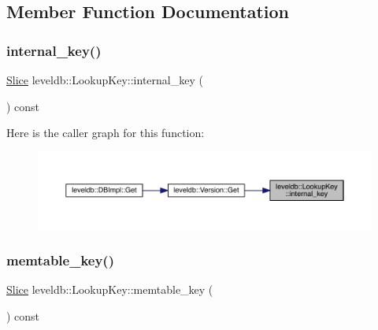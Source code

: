 \subsection{Member Function Documentation}
\mbox{\label{classleveldb_1_1_lookup_key_a3ba069ced6c871a1f420487e8ca99fc1}} 
\subsubsection{\texorpdfstring{internal\_key()}{internal\_key()}}
{\footnotesize\ttfamily \mbox{\hyperlink{classleveldb_1_1_slice}{Slice}} leveldb\+::\+Lookup\+Key\+::internal\+\_\+key (\begin{DoxyParamCaption}{ }\end{DoxyParamCaption}) const\hspace{0.3cm}{\ttfamily [inline]}}

Here is the caller graph for this function\+:
\nopagebreak
\begin{figure}[H]
\begin{center}
\leavevmode
\includegraphics[width=350pt]{classleveldb_1_1_lookup_key_a3ba069ced6c871a1f420487e8ca99fc1_icgraph}
\end{center}
\end{figure}
\mbox{\label{classleveldb_1_1_lookup_key_aa53ebf124713e32632a7aaaee359ac22}} 
\subsubsection{\texorpdfstring{memtable\_key()}{memtable\_key()}}
{\footnotesize\ttfamily \mbox{\hyperlink{classleveldb_1_1_slice}{Slice}} leveldb\+::\+Lookup\+Key\+::memtable\+\_\+key (\begin{DoxyParamCaption}{ }\end{DoxyParamCaption}) const\hspace{0.3cm}{\ttfamily [inline]}}

